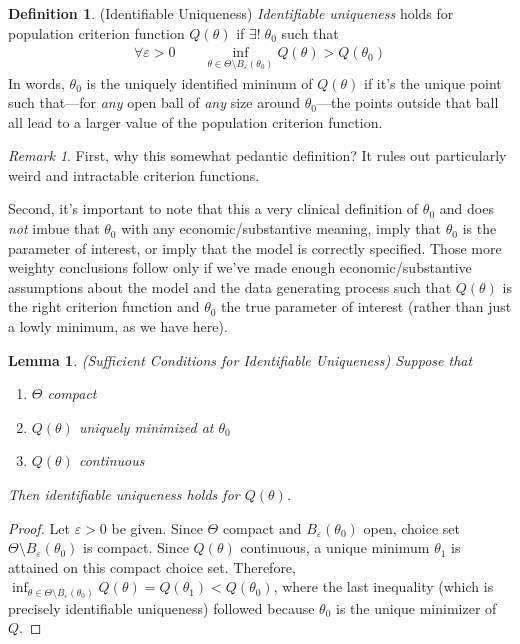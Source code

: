 \documentclass[12pt]{article}
\theoremstyle{plain}
\newtheorem{lem}[thm]{Lemma}
\theoremstyle{definition}
\newtheorem{defn}[thm]{Definition}
\theoremstyle{remark}
\newtheorem*{rmk}{Remark}
\begin{document}
\begin{defn}(Identifiable Uniqueness)
\emph{Identifiable uniqueness} holds for population criterion function
$Q(\theta)$ if $\exists! \;\theta_0$ such that
\begin{align*}
  \forall \varepsilon>0
  \qquad
  \inf_{\theta\in\Theta \setminus B_\varepsilon(\theta_0)}
  Q(\theta)
  > Q(\theta_0)
\end{align*}
In words, $\theta_0$ is the uniquely identified mininum of $Q(\theta)$
if it's the unique point such that---for \emph{any} open ball of
\emph{any} size around $\theta_0$---the points outside that ball all
lead to a larger value of the population criterion function.
\end{defn}

\begin{rmk}
First, why this somewhat pedantic definition?
It rules out particularly weird and intractable criterion functions.

Second, it's important to note that this a very clinical definition of
$\theta_0$ and does \emph{not} imbue that $\theta_0$ with any
economic/substantive meaning, imply that $\theta_0$ is the parameter
of interest, or imply that the model is correctly specified.
Those more weighty conclusions follow only if we've made enough
economic/substantive assumptions about the model and the data generating
process such that $Q(\theta)$ is the right criterion function and
$\theta_0$ the true parameter of interest (rather than just a lowly
minimum, as we have here).
\end{rmk}

\begin{lem}\emph{(Sufficient Conditions for Identifiable Uniqueness)}
Suppose that
\begin{enumerate}[label=\emph{(\roman*)}]
  \item $\Theta$ compact
  \item $Q(\theta)$ uniquely minimized at $\theta_0$
  \item $Q(\theta)$ continuous
\end{enumerate}
Then identifiable uniqueness holds for $Q(\theta)$.
\end{lem}
\begin{proof}
Let $\varepsilon>0$ be given.
Since $\Theta$ compact and $B_\varepsilon(\theta_0)$ open, choice
set $\Theta\setminus B_\varepsilon(\theta_0)$ is compact.
Since $Q(\theta)$ continuous, a unique minimum $\theta_1$ is attained
on this compact choice set.
Therefore, $\inf_{\theta\in\Theta\setminus B_\varepsilon(\theta_0)}
Q(\theta)=Q(\theta_1)<Q(\theta_0)$,
where the last inequality (which is precisely identifiable uniqueness)
followed because $\theta_0$ is the unique minimizer of $Q$.
\end{proof}
\end{document}
